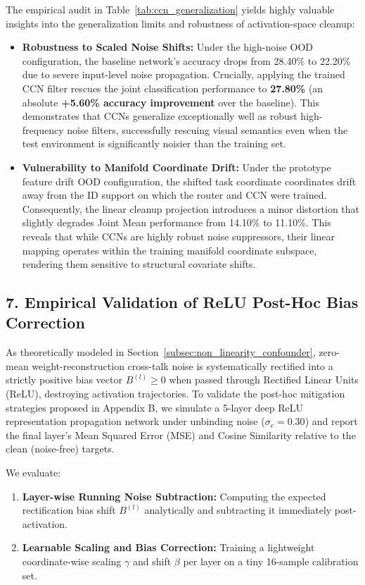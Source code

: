 The empirical audit in Table~\ref{tab:ccn_generalization} yields highly valuable insights into the generalization limits and robustness of activation-space cleanup:
\begin{itemize}
    \item \textbf{Robustness to Scaled Noise Shifts:} Under the high-noise OOD configuration, the baseline network's accuracy drops from 28.40\% to 22.20\% due to severe input-level noise propagation. Crucially, applying the trained CCN filter rescues the joint classification performance to \textbf{27.80\%} (an absolute \textbf{+5.60\% accuracy improvement} over the baseline). This demonstrates that CCNs generalize exceptionally well as robust high-frequency noise filters, successfully rescuing visual semantics even when the test environment is significantly noisier than the training set.
    \item \textbf{Vulnerability to Manifold Coordinate Drift:} Under the prototype feature drift OOD configuration, the shifted task coordinate coordinates drift away from the ID support on which the router and CCN were trained. Consequently, the linear cleanup projection introduces a minor distortion that slightly degrades Joint Mean performance from 14.10\% to 11.10\%. This reveals that while CCNs are highly robust noise suppressors, their linear mapping operates within the training manifold coordinate subspace, rendering them sensitive to structural covariate shifts.
\end{itemize}

\subsection{7. Empirical Validation of ReLU Post-Hoc Bias Correction}
\label{subsec:relu_bias_empirical}

As theoretically modeled in Section~\ref{subsec:non_linearity_confounder}, zero-mean weight-reconstruction cross-talk noise is systematically rectified into a strictly positive bias vector $B^{(l)} \ge 0$ when passed through Rectified Linear Units (ReLU), destroying activation trajectories. To validate the post-hoc mitigation strategies proposed in Appendix B, we simulate a 5-layer deep ReLU representation propagation network under unbinding noise ($\sigma_e = 0.30$) and report the final layer's Mean Squared Error (MSE) and Cosine Similarity relative to the clean (noise-free) targets.

We evaluate:
\begin{enumerate}
    \item \textbf{Layer-wise Running Noise Subtraction:} Computing the expected rectification bias shift $B^{(l)}$ analytically and subtracting it immediately post-activation.
    \item \textbf{Learnable Scaling and Bias Correction:} Training a lightweight coordinate-wise scaling $\gamma$ and shift $\beta$ per layer on a tiny 16-sample calibration set.
\end{enumerate}

